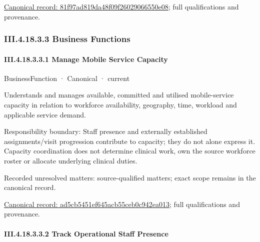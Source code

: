 {\footnotesize \href{../../../../continuum/business/business-function/81f97ad819da48f09f26029066550e08.md}{Canonical record: 81f97ad819da48f09f26029066550e08}; full qualifications and provenance.}\par
\subsubsection*{III.4.18.3.3 Business Functions}
\label{navigation:III.4.18.3.3}

\paragraph*{III.4.18.3.3.1 Manage Mobile Service Capacity}
\label{navigation:III.4.18.3.3.1}

\label{element:ad5cb5451ef645acb55ceb0c942ea013}
{\small BusinessFunction · Canonical · current}\par

Understands and manages available, committed and utilised mobile-service capacity in relation to workforce availability, geography, time, workload and applicable service demand.



Responsibility boundary: Staff presence and externally established assignments/visit progression contribute to capacity; they do not alone express it. Capacity coordination does not determine clinical work, own the source workforce roster or allocate underlying clinical duties.


{\small Recorded unresolved matters: source-qualified matters; exact scope remains in the canonical record.}\par
{\footnotesize \href{../../../../continuum/business/business-function/ad5cb5451ef645acb55ceb0c942ea013.md}{Canonical record: ad5cb5451ef645acb55ceb0c942ea013}; full qualifications and provenance.}\par
\paragraph*{III.4.18.3.3.2 Track Operational Staff Presence}
\label{navigation:III.4.18.3.3.2}

